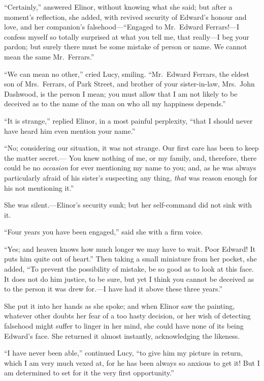 ``Certainly,'' answered Elinor, without knowing what
she said; but after a moment's reflection, she added,
with revived security of Edward's honour and love,
and her companion's falsehood---``Engaged to Mr.\ Edward
Ferrars!---I confess myself so totally surprised at
what you tell me, that really---I beg your pardon;
but surely there must be some mistake of person or name.
We cannot mean the same Mr.\ Ferrars.''

``We can mean no other,'' cried Lucy, smiling.  ``Mr.\ Edward
Ferrars, the eldest son of Mrs.\ Ferrars, of Park Street,
and brother of your sister-in-law, Mrs.\ John Dashwood,
is the person I mean; you must allow that I am not likely
to be deceived as to the name of the man on who all my happiness
depends.''

``It is strange,'' replied Elinor, in a most painful perplexity,
``that I should never have heard him even mention your name.''

``No; considering our situation, it was not strange.
Our first care has been to keep the matter secret.---%
You knew nothing of me, or my family, and, therefore,
there could be no \emph{occasion} for ever mentioning my name
to you; and, as he was always particularly afraid of his
sister's suspecting any thing, \emph{that} was reason enough
for his not mentioning it.''

She was silent.---Elinor's security sunk; but her
self-command did not sink with it.

``Four years you have been engaged,'' said she
with a firm voice.

``Yes; and heaven knows how much longer we may have
to wait.  Poor Edward!  It puts him quite out of heart.''
Then taking a small miniature from her pocket, she added,
``To prevent the possibility of mistake, be so good as to look
at this face.  It does not do him justice, to be sure,
but yet I think you cannot be deceived as to the person
it was drew for.---I have had it above these three years.''

She put it into her hands as she spoke; and when Elinor
saw the painting, whatever other doubts her fear of a
too hasty decision, or her wish of detecting falsehood
might suffer to linger in her mind, she could have none of
its being Edward's face.  She returned it almost instantly,
acknowledging the likeness.

``I have never been able,'' continued Lucy, ``to give
him my picture in return, which I am very much vexed at,
for he has been always so anxious to get it!  But I am
determined to set for it the very first opportunity.''

